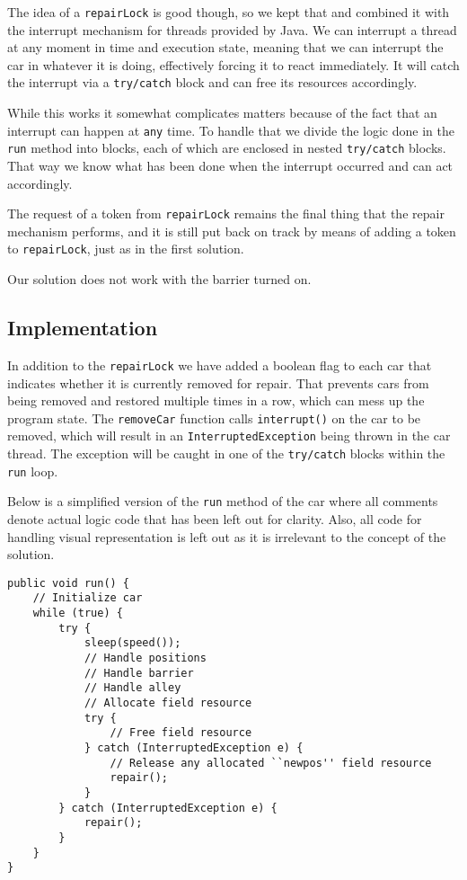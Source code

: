 The idea of a \texttt{repairLock} is good though, so we kept that and combined it with the interrupt mechanism for threads provided by Java. We can interrupt a thread at any moment in time and execution state, meaning that we can interrupt the car in whatever it is doing, effectively forcing it to react immediately. It will catch the interrupt via a \texttt{try/catch} block and can free its resources accordingly.

While this works it somewhat complicates matters because of the fact that an interrupt can happen at \texttt{any} time. To handle that we divide the logic done in the \texttt{run} method into blocks, each of which are enclosed in nested \texttt{try/catch} blocks. That way we know what has been done when the interrupt occurred and can act accordingly.

The request of a token from \texttt{repairLock} remains the final thing that the repair mechanism performs, and it is still put back on track by means of adding a token to \texttt{repairLock}, just as in the first solution.

Our solution does not work with the barrier turned on.

\subsection{Implementation}
In addition to the \texttt{repairLock} we have added a boolean flag to each car that indicates whether it is currently removed for repair. That prevents cars from being removed and restored multiple times in a row, which can mess up the program state. The \texttt{removeCar} function calls \texttt{interrupt()} on the car to be removed, which will result in an \texttt{InterruptedException} being thrown in the car thread. The exception will be caught in one of the \texttt{try/catch} blocks within the \texttt{run} loop.

Below is a simplified version of the \texttt{run} method of the car where all comments denote actual logic code that has been left out for clarity. Also, all code for handling visual representation is left out as it is irrelevant to the concept of the solution.

\begin{lstlisting}
public void run() {
	// Initialize car
	while (true) {
		try {
			sleep(speed());
			// Handle positions
			// Handle barrier
			// Handle alley
			// Allocate field resource
			try {
				// Free field resource
			} catch (InterruptedException e) {
				// Release any allocated ``newpos'' field resource
				repair();
			}
		} catch (InterruptedException e) {
			repair();
		}
	}
}
\end{lstlisting}

